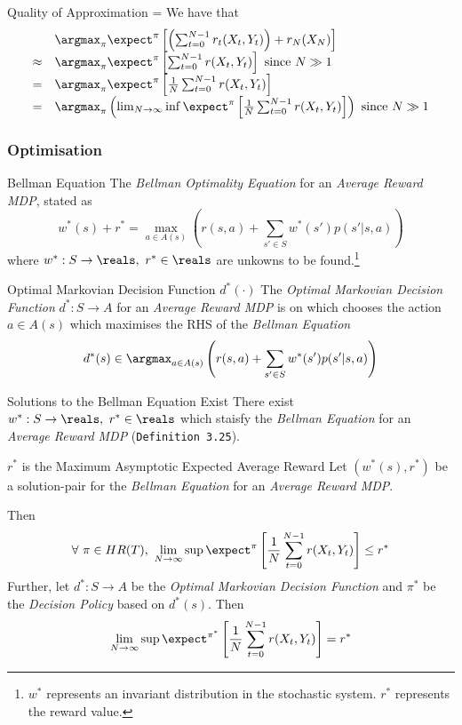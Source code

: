 \documentclass[11pt,a4paper]{article}
\begin{document}
  \begin{proposition}{Quality of Approximation}
    \everymath={\displaystyle}
    We have that
    \[\begin{array}{rl}
      &\argmax_\pi\expect^\pi\left[\left(\sum_{t=0}^{N-1}r_t(X_t,Y_t)\right)+r_N(X_N)\right]\\
      \approx&\argmax_\pi\expect^\pi\left[\sum_{t=0}^{N-1}r(X_t,Y_t)\right]\text{ since }N\gg1\\
      =&\argmax_\pi\expect^\pi\left[\frac1N\sum_{t=0}^{N-1}r(X_t,Y_t)\right]\\
      =&\argmax_\pi\left(\lim_{N\to\infty}\inf\expect^\pi\left[\frac1N\sum_{t=0}^{N-1}r(X_t,Y_t)\right]\right)\text{ since }N\gg1
    \end{array}\]
  \end{proposition}

\subsubsection{Optimisation}

  \begin{definition}{Bellman Equation}
    The \textit{Bellman Optimality Equation} for an \textit{Average Reward MDP}, stated as
    \[ w^*(s)+r^*=\max_{a\in A(s)}\left(r(s,a)+\sum_{s'\in S}w^*(s')p(s'|s,a)\right) \]
    where $w^*:S\to\reals,\ r^*\in\reals$ are unkowns to be found.\footnote{$w^*$ represents an invariant distribution in the stochastic system. $r^*$ represents the reward value.}
  \end{definition}

  \begin{definition}{Optimal Markovian Decision Function $d^*(\cdot)$}
    The \textit{Optimal Markovian Decision Function} $d^*:S\to A$ for an \textit{Average Reward MDP} is on which chooses the action $a\in A(s)$ which maximises the RHS of the \textit{Bellman Equation}
    \[ d^*(s)\in\argmax_{a\in A(s)}\left(r(s,a)+\sum_{s'\in S}w^*(s')p(s'|s,a)\right) \]
  \end{definition}

  \begin{theorem}{Solutions to the Bellman Equation Exist}
    There exist $w^*:S\to\reals,\ r^*\in\reals$ which staisfy the \textit{Bellman Equation} for an \textit{Average Reward MDP} (\texttt{Definition 3.25}).
  \end{theorem}

  \begin{theorem}{$r^*$ is the Maximum Asymptotic Expected Average Reward}
    Let $(w^*(s),r^*)$ be a solution-pair for the \textit{Bellman Equation} for an \textit{Average Reward MDP}.
    \par Then
    \[ \forall\ \pi\in HR(T),\ \lim_{N\to\infty}\sup\expect^\pi\left[\frac1N\sum_{t=0}^{N-1}r(X_t,Y_t)\right]\leq r^* \]
    Further, let $d^*:S\to A$ be the \textit{Optimal Markovian Decision Function} and $\pi^*$ be the \textit{Decision Policy} based on $d^*(s)$. Then
    \[ \lim_{N\to\infty}\sup\expect^{\pi^*}\left[\frac1N\sum_{t=0}^{N-1}r(X_t,Y_t)\right]=r^* \]
  \end{theorem}
\end{document}
